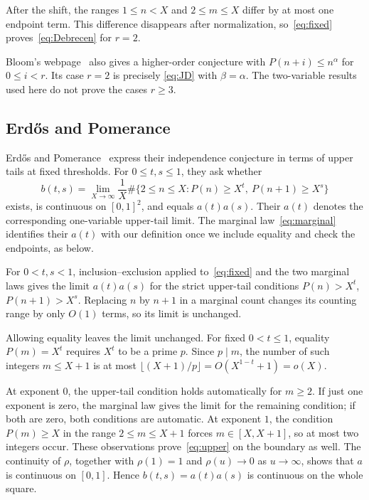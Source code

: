 \documentclass[11pt,a4paper]{amsart}
\begin{document}
After the shift, the ranges $1\le n<X$ and $2\le m\le X$ differ by
at most one endpoint term. This difference disappears after
normalization, so~\eqref{eq:fixed} proves~\eqref{eq:Debrecen} for $r=2$.

Bloom's webpage~\cite{Bloom928} also gives a higher-order conjecture with
$P(n+i)\le n^\alpha$ for $0\le i<r$. Its case $r=2$ is precisely
\eqref{eq:JD} with $\beta=\alpha$. The two-variable results used here
do not prove the cases $r\ge3$.

\subsection{Erd\H{o}s and Pomerance}
Erd\H{o}s and Pomerance~\cite[p.~311]{ErdosPomerance1978} express their
independence conjecture in terms of upper tails at fixed thresholds.
For $0\le t,s\le1$,
they ask whether
\begin{equation}\label{eq:upper}
 b(t,s)=\lim_{X\to\infty}\frac1X
 \#\{2\le n\le X:P(n)\ge X^t,\ P(n+1)\ge X^s\}
\end{equation}
exists, is continuous on $[0,1]^2$, and equals $a(t)a(s)$.
Their $a(t)$ denotes the corresponding one-variable upper-tail limit.
The marginal law~\eqref{eq:marginal} identifies their $a(t)$ with our
definition once we include equality and check the endpoints, as below.

For $0<t,s<1$, inclusion--exclusion applied to~\eqref{eq:fixed} and the
two marginal laws gives the limit $a(t)a(s)$ for the strict upper-tail
conditions $P(n)>X^t$, $P(n+1)>X^s$.
Replacing $n$ by $n+1$ in a marginal count changes its counting range
by only $O(1)$ terms, so its limit is unchanged.

Allowing equality leaves the limit unchanged. For fixed $0<t\le1$,
equality $P(m)=X^t$ requires $X^t$ to be a prime $p$.
Since $p\mid m$, the number of such integers $m\le X+1$ is at most
$\lfloor(X+1)/p\rfloor=O(X^{1-t}+1)=o(X)$.

At exponent $0$, the upper-tail condition holds automatically for $m\ge2$.
If just one exponent is zero, the marginal law gives the limit for the
remaining condition; if both are zero, both conditions are automatic.
At exponent $1$, the condition $P(m)\ge X$ in
the range $2\le m\le X+1$ forces $m\in[X,X+1]$, so at most two
integers occur. These observations prove~\eqref{eq:upper} on the boundary as well.
The continuity of $\rho$, together with $\rho(1)=1$ and
$\rho(u)\to0$ as $u\to\infty$, shows that $a$ is continuous on $[0,1]$.
Hence $b(t,s)=a(t)a(s)$ is continuous on the whole square.
\end{document}
